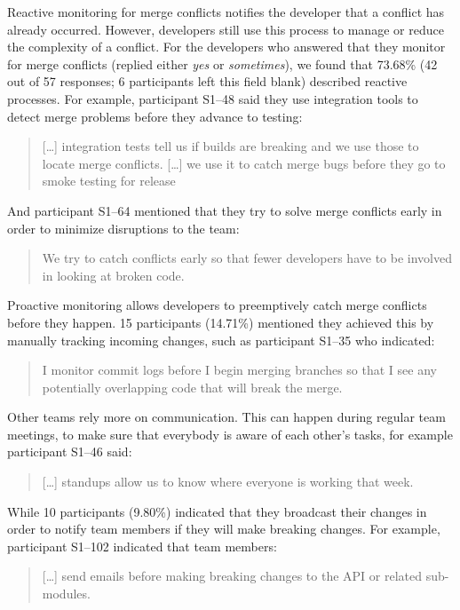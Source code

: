 
Reactive monitoring for merge conflicts notifies the developer that a conflict has already occurred.
However, developers still use this process to manage or reduce the complexity of a conflict.
For the developers who answered that they monitor for merge conflicts (replied either \emph{yes} or \emph{sometimes}), we found that 73.68\% (42 out of 57 responses; 6 participants left this field blank) described reactive processes.
For example, participant S1--48 said they use integration tools to detect merge problems before they advance to testing:
\begin{quotation}
	[\ldots] integration tests tell us if builds are breaking and we use those to locate merge conflicts. [\ldots] we use it to catch merge bugs before they go to smoke testing for release
\end{quotation}
And participant S1--64 mentioned that they try to solve merge conflicts early in order to minimize disruptions to the team:
\begin{quotation}
	We try to catch conflicts early so that fewer developers have to be involved in looking at broken code.
\end{quotation}

Proactive monitoring allows developers to preemptively catch merge conflicts before they happen.
15 participants (14.71\%) mentioned they achieved this by manually tracking incoming changes, such as participant S1--35 who indicated:
\begin{quotation}
	I monitor commit logs before I begin merging branches so that I see any potentially overlapping code that will break the merge.
\end{quotation}
Other teams rely more on communication.
This can happen during regular team meetings, to make sure that everybody is aware of each other's tasks, for example participant S1--46 said:
\begin{quotation}
	[\ldots] standups allow us to know where everyone is working that week.
\end{quotation}
While 10 participants (9.80\%) indicated that they broadcast their changes in order to notify team members if they will make breaking changes.
For example, participant S1--102 indicated that team members:
\begin{quotation}
	[\ldots] send emails before making breaking changes to the API or related sub-modules.
\end{quotation}


